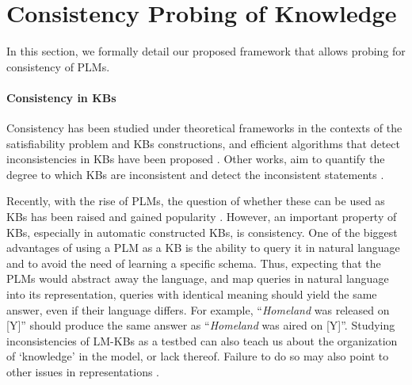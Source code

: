 \section{Consistency Probing of Knowledge}
\label{sec:framework}

In this section, we formally detail our proposed framework that allows probing for consistency of PLMs.

\paragraph{Consistency in KBs}

Consistency has been studied under theoretical frameworks in the contexts of the satisfiability problem and KBs constructions, and efficient algorithms that detect inconsistencies in KBs have been proposed \cite{hansen2000probabilistic,andersen2001easy}.
Other works, aim to quantify the degree to which KBs are inconsistent and detect the inconsistent statements \cite{Thimm:2009d,muino2011measuring,Thimm:2013}.

Recently, with the rise of PLMs, the question of whether these can be used as KBs has been raised and gained popularity \cite{lama,petroni2020how,jiang2020can}. However, an important property of KBs, especially in automatic constructed KBs, is consistency.
One of the biggest advantages of using a PLM as a KB is the ability to query it in natural language and to avoid the need of learning a specific schema.
Thus, expecting that the PLMs would abstract away the language, and map queries in natural language into its representation, queries with identical meaning should yield the same answer, even if their language differs.
For example, ``\textit{Homeland} was released on [Y]'' should produce the same answer as ``\textit{Homeland} was aired on [Y]''.
Studying inconsistencies of LM-KBs as a testbed can also teach us about the organization of `knowledge' in the model, or lack thereof. Failure to do so may also point to other issues in representations \cite{w2v-synonyms-antonyms-studies}.

